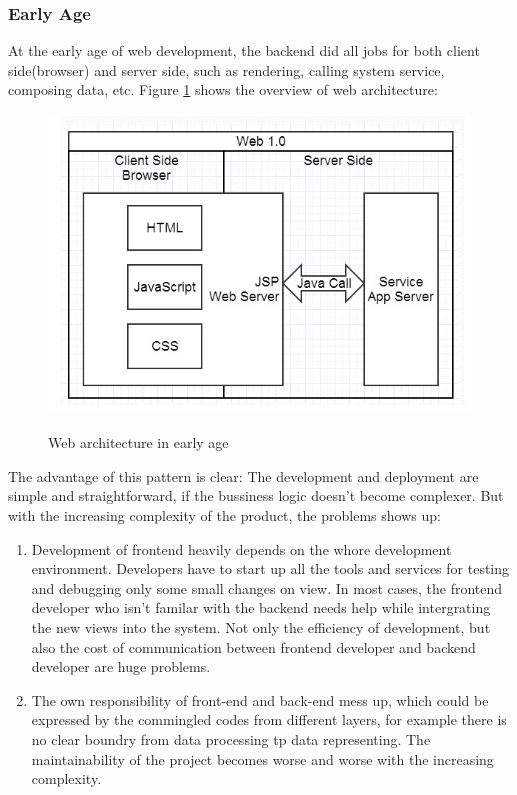 \subsubsection{Early Age}
At the early age of web development, the backend did all jobs for both client side(browser) and server side, such as rendering, calling system service, composing data, etc. Figure \ref{fig:3.1} shows the overview of web architecture:
\begin{figure}[!htbp]
  \caption{Web architecture in early age}
  \centering
    \includegraphics[width=1\textwidth]{Figures/3_1.png}
  \label{fig:3.1}
\end{figure}
The advantage of this pattern is clear: The development and deployment are simple and straightforward, if the bussiness logic doesn't become complexer. But with the increasing complexity of the product, the problems shows up:
\begin{enumerate}
\item
Development of frontend heavily depends on the whore development environment. Developers have to start up all the tools and services for testing and debugging only some small changes on view. In most cases, the frontend developer who isn't familar with the backend needs help while intergrating the new views into the system. Not only the efficiency of development, but also the cost of communication between frontend developer and backend developer are huge problems.
\item
The own responsibility of front-end and back-end mess up, which could be expressed by the commingled codes from different layers, for example there is no clear boundry from data processing tp data representing. The maintainability of the project becomes worse and worse with the increasing complexity.
\end{enumerate}

